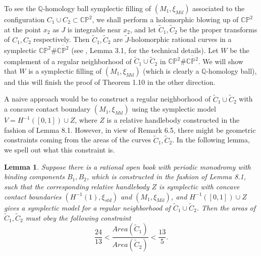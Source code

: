 \documentclass[11pt]{amsart}
\theoremstyle{plain}
\numberwithin{theorem}{section}
\newtheorem{lemma}[theorem]{Lemma}
\theoremstyle{definition}
\newcommand{\C}{{\mathbb C}}
\newcommand{\Q}{{\mathbb Q}}
\renewcommand{\P}{{\mathbb P}}
\begin{document}
To see the $\Q$-homology ball symplectic filling of $(M_1,\xi_{Mil})$ associated to the 
configuration $C_1\cup C_2\subset \C\P^2$, we shall perform a holomorphic blowing up 
of $\C\P^2$ at the point $x_2$ as $J$ is integrable near $x_2$, and let $\tilde{C}_1,\tilde{C}_2$ be the proper transforms of $C_1,C_2$ respectively. Then $\tilde{C}_1,\tilde{C}_2$ are $\tilde{J}$-holomorphic rational curves 
in a symplectic $\C\P^2\# \overline{\C\P^2}$ (see \cite{C5}, Lemma 3.1, for the technical details). Let $W$ be the complement of a regular neighborhood of $\tilde{C}_1\cup\tilde{C}_2$ in $\C\P^2\# \overline{\C\P^2}$. We will show that $W$ is a symplectic filling of $(M_1,\xi_{Mil})$ (which is clearly a $\Q$-homology ball), and this will finish the proof of Theorem 1.10 in the other direction.

A naive approach would be to construct a regular neighborhood of $\tilde{C}_1\cup\tilde{C}_2$ with a concave contact boundary $(M_1,\xi_{Mil})$ using the symplectic model $V=H^{-1}([0,1])\cup Z$, where $Z$ is a relative handlebody constructed in the fashion of Lemma 8.1. However, in view of Remark 6.5, there might be geometric constraints coming from the areas of the curves $\tilde{C}_1,\tilde{C}_2$. In the following lemma, we spell out
what this constraint is. 

\begin{lemma}
Suppose there is a rational open book with periodic monodromy with binding components $B_1,B_2$, which is constructed in the fashion of Lemma 8.1, such that the corresponding relative handlebody $Z$ is symplectic with
concave contact boundaries $(H^{-1}(1),\xi_{std})$ and $(M_1, \xi_{Mil})$, and $H^{-1}([0,1])\cup Z$ gives a symplectic model for a regular neighborhood of $\tilde{C}_1\cup\tilde{C}_2$. Then the areas of 
$\tilde{C}_1, \tilde{C}_2$ must obey the following constraint 
$$
\frac{24}{13}<\frac{Area(\tilde{C}_1)}{Area(\tilde{C}_2)}<\frac{13}{5}.
$$
\end{lemma}
\end{document}
